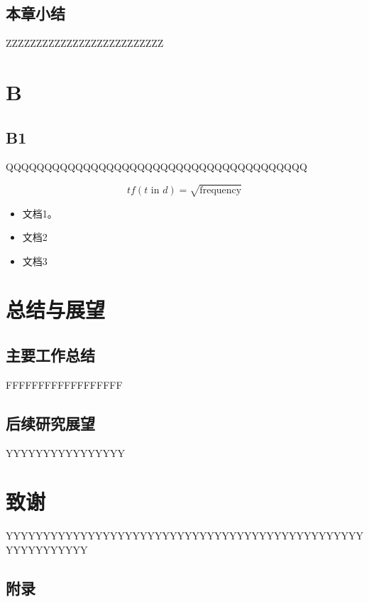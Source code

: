\documentclass{cqupt}
\begin{document}
\section{本章小结}
ZZZZZZZZZZZZZZZZZZZZZZZZZZ
\setcounter{figure}{0}
\setcounter{table}{0}
\chapter{B}
\section{B1}
QQQQQQQQQQQQQQQQQQQQQQQQQQQQQQQQQQQQQQQ

\begin{equation}
tf(t\mbox{ in }d) = \sqrt{\mathrm{frequency}}
\end{equation}


\begin{itemize}
\item 文档1。
\item 文档2
\item 文档3
\end{itemize}

\setcounter{figure}{0}
\setcounter{table}{0}

\chapter{总结与展望}
\section{主要工作总结}
FFFFFFFFFFFFFFFFFF
\section{后续研究展望}
YYYYYYYYYYYYYYYY

\begin{thebibliography}{99}

\end{thebibliography}

\vspace*{-20pt}
\chapter*{致\hspace{1em}谢}
YYYYYYYYYYYYYYYYYYYYYYYYYYYYYYYYYYYYYYYYYYYYYYYYYYYYYYYYYYY

\clearpage
\appendix
\begin{appendices}
\chapter*{附\hspace{1em}录}

\end{appendices}
\end{document}
